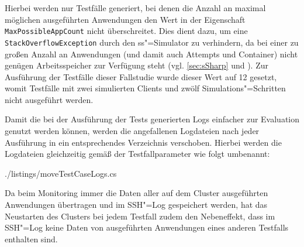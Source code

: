 Hierbei werden nur Testfälle generiert, bei denen die Anzahl an maximal möglichen ausgeführten Anwendungen den Wert in der Eigenschaft \texttt{MaxPossibleAppCount} nicht überschreitet.
Dies dient dazu, um eine \texttt{StackOverflowException} durch den \ac{ss}"=Simulator zu verhindern, da bei einer zu großen Anzahl an Anwendungen (und damit auch Attempts und Container) nicht genügen Arbeitsspeicher zur Verfügung steht (vgl. \autoref{sec:sSharp} und ).
Zur Ausführung der Testfälle dieser Fallstudie wurde dieser Wert auf 12 gesetzt, womit Testfälle mit zwei simulierten Clients und zwölf Simulations"=Schritten nicht ausgeführt werden.

Damit die bei der Ausführung der Tests generierten Logs einfacher zur Evaluation genutzt werden können, werden die angefallenen Logdateien nach jeder Ausführung in ein entsprechendes Verzeichnis verschoben.
Hierbei werden die Logdateien gleichzeitig gemäß der Testfallparameter wie folgt umbenannt:


{./listings/moveTestCaseLogs.cs}

Da beim Monitoring immer die Daten aller auf dem Cluster ausgeführten Anwendungen übertragen und im SSH"=Log gespeichert werden, hat das Neustarten des Clusters bei jedem Testfall zudem den Nebeneffekt, dass im SSH"=Log keine Daten von ausgeführten Anwendungen eines anderen Testfalls enthalten sind.
